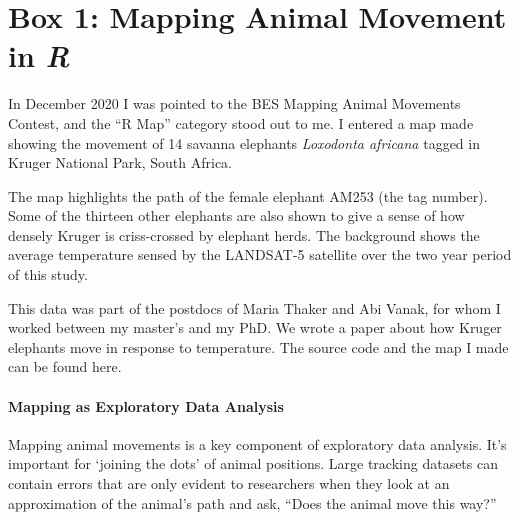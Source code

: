 
\pagestyle{plain}
\pagecolor{Snow2}\afterpage{\nopagecolor}

	\medskip
	\section*{Box 1: Mapping Animal Movement in \textit{R}}\label{box:mapping}

	In December 2020 I was pointed to the BES Mapping Animal Movements Contest, and the “R Map” category stood out to me. I entered a map made showing the movement of 14 savanna elephants \textit{Loxodonta africana} tagged in Kruger National Park, South Africa.

	\medskip

	The map highlights the path of the female elephant AM253 (the tag number). Some of the thirteen other elephants are also shown to give a sense of how densely Kruger is criss-crossed by elephant herds. The background shows the average temperature sensed by the LANDSAT-5 satellite over the two year period of this study.

	\medskip

	This data was part of the postdocs of Maria Thaker and Abi Vanak, for whom I worked between my master's and my PhD. We wrote a paper about how Kruger elephants move in response to temperature. The source code and the map I made can be found here.

	\medskip

	\paragraph*{Mapping as Exploratory Data Analysis}

	Mapping animal movements is a key component of exploratory data analysis. It's important for `joining the dots' of animal positions. Large tracking datasets can contain errors that are only evident to researchers when they look at an approximation of the animal's path and ask, “Does the animal move this way?”

